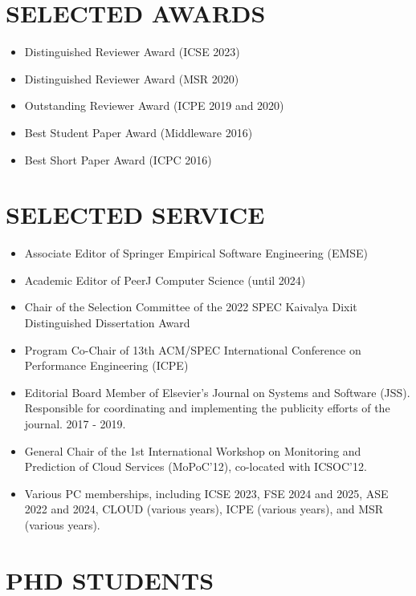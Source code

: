 \documentclass[paper=letter,fontsize=11pt]{scrartcl} %
\newcommand{\NewPart}[2]{\section*{\uppercase{#1} #2}}
\begin{document}
\NewPart{Selected Awards}{}
\begin{itemize}
\itemsep0em 
\item Distinguished Reviewer Award (ICSE 2023)   
\item Distinguished Reviewer Award (MSR 2020)
\item Outstanding Reviewer Award (ICPE 2019 and 2020)
\item Best Student Paper Award (Middleware 2016)
\item Best Short Paper Award (ICPC 2016)
\end{itemize}

\NewPart{Selected Service}{}
\begin{itemize}
  \itemsep0em 
\item Associate Editor of Springer Empirical Software Engineering (EMSE)
\item Academic Editor of PeerJ Computer Science (until 2024)
\item Chair of the Selection Committee of the 2022 SPEC Kaivalya Dixit Distinguished Dissertation Award 
\item Program Co-Chair of 13th ACM/SPEC International Conference on Performance Engineering (ICPE) 
\item Editorial Board Member of Elsevier's Journal on Systems and Software (JSS). Responsible for coordinating and implementing the publicity efforts of the journal. 2017 - 2019.
\item General Chair of the 1st International Workshop on Monitoring and
Prediction of Cloud Services (MoPoC'12), co-located with ICSOC'12.
\item Various PC memberships, including ICSE 2023, FSE 2024 and 2025, ASE 2022 and 2024, CLOUD (various years), ICPE (various years), and MSR (various years).
\end{itemize}

\NewPart{PhD Students}{}
\end{document}
